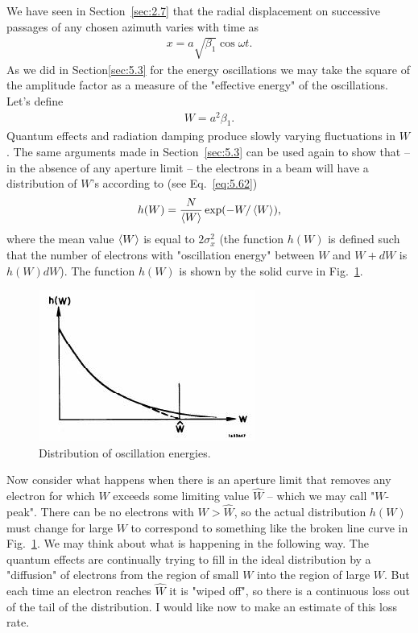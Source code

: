 We have seen in Section~\ref{sec:2.7} that the radial displacement on successive passages of any chosen azimuth varies with time as
\begin{align}
	x = a \sqrt{\beta_1} \cos\omega t.
\end{align}
As we did in Section\ref{sec:5.3} for the energy oscillations we may take the square of the
amplitude factor as a measure of the "effective energy" of the oscillations. Let's define
\begin{align}
	W = a^2 \beta_1.
\end{align}
Quantum effects and radiation damping produce slowly varying fluctuations in $W$. The same arguments made in Section~\ref{sec:5.3} can be used again to show that -- in the absence of any aperture limit -- the electrons in a beam will have a distribution of $W$'s according to (see Eq.~\eqref{eq:5.62})
\begin{align}\label{eq:5.120}
	h(W) = \dfrac{N}{\left< W \right>}\exp(-W/\left< W \right>),
\end{align}
where the mean value $\left< W \right>$ is equal to $2\sigma_x^2$ (the function $h(W)$ is defined such
that the number of electrons with "oscillation energy" between $W$ and $W + dW$ is $h(W)dW$). The function $h(W)$ is shown by the solid curve in Fig.~\ref{fig:fig47}.
\begin{figure}[!htb]
	\centering
	\includegraphics[width=0.8\linewidth]{./Figuras/fig47.jpeg}
	\caption{Distribution of oscillation energies.}
	\label{fig:fig47}
\end{figure}
Now consider what happens when there is an aperture limit that removes any electron for which $W$ exceeds some limiting value $\hat{W}$ -- which we may call "$W$-peak". There can be no electrons with $W > \hat{W}$, so the actual distribution $h(W)$ must change for large $W$ to correspond to something like the broken line curve in Fig.~\ref{fig:fig47}. We may think about what is happening in the following way. The quantum effects are continually trying to fill in the ideal distribution by a "diffusion" of electrons from the region of small $W$ into the region of large $W$. But each time an electron reaches $\hat{W}$ it is "wiped off", so there is a continuous loss out of the tail of the distribution. I would like now to make an estimate of this loss rate.\\

